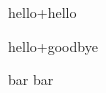 \documentclass{article}
\begin{document}
  \def\bar{hello}
  \let\fooi\bar
  \def\fooii{\bar}
  \fooi +\fooii

  \def\bar{goodbye}
  \fooi +\fooii

  \def \foo {bar}
  \let \baz \foo
  \baz %
  \def \foo {new-definition}
  \baz %
  
  
\end{document}
